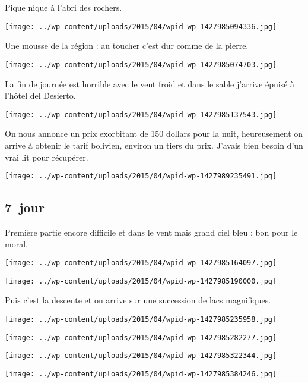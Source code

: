  Pique nique à l'abri des rochers.
\begin{center} \texttt{[image: ../wp-content/uploads/2015/04/wpid-wp-1427985094336.jpg]} \end{center}

\pagebreak
 Une mousse de la région : au toucher c'est dur comme de la pierre.
\begin{center} \texttt{[image: ../wp-content/uploads/2015/04/wpid-wp-1427985074703.jpg]} \end{center}

 La fin de journée est horrible avec le vent froid et dans le sable j'arrive épuisé à l'hôtel del Desierto.
\begin{center} \texttt{[image: ../wp-content/uploads/2015/04/wpid-wp-1427985137543.jpg]} \end{center}

  On nous annonce un prix exorbitant de 150 dollars pour la nuit, heureusement on arrive à obtenir le tarif bolivien, environ un tiers du prix. J'avais bien besoin d'un vrai lit pour récupérer.
\begin{center} \texttt{[image: ../wp-content/uploads/2015/04/wpid-wp-1427989235491.jpg]} \end{center}

 \subsection*{7\ieme\ jour} 

 Première partie encore difficile et dans le vent mais grand ciel bleu : bon pour le moral.
\begin{center} \texttt{[image: ../wp-content/uploads/2015/04/wpid-wp-1427985164097.jpg]} \end{center}
\begin{center} \texttt{[image: ../wp-content/uploads/2015/04/wpid-wp-1427985190000.jpg]} \end{center}

  Puis c'est la descente et on arrive sur une succession de lacs magnifiques.
\begin{center} \texttt{[image: ../wp-content/uploads/2015/04/wpid-wp-1427985235958.jpg]} \end{center}
\begin{center} \texttt{[image: ../wp-content/uploads/2015/04/wpid-wp-1427985282277.jpg]} \end{center}
\begin{center} \texttt{[image: ../wp-content/uploads/2015/04/wpid-wp-1427985322344.jpg]} \end{center}
\begin{center} \texttt{[image: ../wp-content/uploads/2015/04/wpid-wp-1427985384246.jpg]} \end{center}

